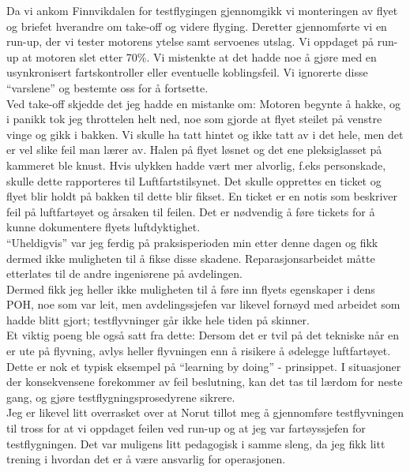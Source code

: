 \documentclass[12pt, a4paper]{article}
\begin{document}
Da vi ankom Finnvikdalen for testflygingen gjennomgikk vi monteringen av flyet og  briefet hverandre om take-off og videre flyging. Deretter gjennomførte vi en run-up, der vi tester motorens ytelse samt servoenes utslag. Vi oppdaget på run-up at motoren slet etter 70\%. Vi mistenkte at det hadde noe å gjøre med en usynkronisert fartskontroller eller eventuelle koblingsfeil. Vi ignorerte disse ``varslene'' og bestemte oss for å fortsette. \\
\newpage
Ved take-off skjedde det jeg hadde en mistanke om: Motoren begynte å hakke, og i panikk tok jeg throttelen helt ned, noe som gjorde at flyet steilet på venstre vinge og gikk i bakken. Vi skulle ha tatt hintet og ikke tatt av i det hele, men det er vel slike feil man lærer av. Halen på flyet løsnet og det ene pleksiglasset på kammeret ble knust. 
Hvis ulykken hadde vært mer alvorlig, f.eks personskade, skulle dette rapporteres til Luftfartstilsynet. Det skulle opprettes en ticket og flyet blir holdt på bakken til dette blir fikset. En ticket er en notis som beskriver feil på luftfartøyet og årsaken til feilen. Det er nødvendig å føre tickets for å kunne dokumentere flyets luftdyktighet.\\

``Uheldigvis'' var jeg ferdig på praksisperioden min etter denne dagen og fikk dermed ikke muligheten til å fikse disse skadene. Reparasjonsarbeidet måtte etterlates til de andre ingeniørene på avdelingen.\\ Dermed fikk jeg heller ikke muligheten til å føre inn flyets egenskaper i dens POH, noe som var leit, men avdelingssjefen var likevel fornøyd med arbeidet som hadde blitt gjort; testflyvninger går ikke hele tiden på skinner. \\
Et viktig poeng ble også satt fra dette: Dersom det er tvil på det tekniske når en er ute på flyvning, avlys heller flyvningen enn å risikere å ødelegge luftfartøyet. Dette er nok et typisk eksempel på ``learning by doing'' - prinsippet. I situasjoner der konsekvensene forekommer av feil beslutning, kan det tas til lærdom for neste gang, og gjøre testflygningsprosedyrene sikrere. \\

Jeg er likevel litt overrasket over at Norut tillot meg å gjennomføre testflyvningen til tross for at vi oppdaget feilen ved run-up og at jeg var fartøyssjefen for testflygningen. Det var muligens litt pedagogisk i samme sleng, da jeg fikk litt trening i hvordan det er å være ansvarlig for operasjonen.  
\end{document}
